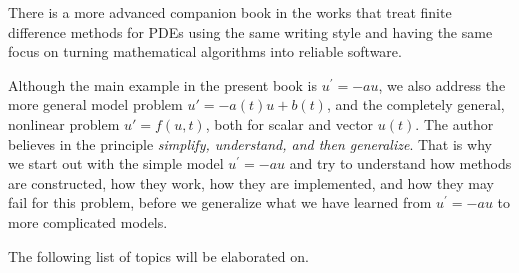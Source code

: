 \documentclass[graybox,sectrefs,envcountresetchap,open=right,final]{svmonodo}
\begin{document}
There is a more advanced companion book in the works that treat finite
difference methods for PDEs using the same writing style and having
the same focus on turning mathematical algorithms into reliable
software.

Although the main example in the present book is $u^{\prime}=-au$, we
also address the more general model problem $u'=-a(t)u + b(t)$, and
the completely general, nonlinear problem $u'=f(u,t)$, both for scalar
and vector $u(t)$. The author believes in the principle \emph{simplify,
understand, and then generalize}. That is why we start out with the
simple model $u^{\prime}=-au$ and try to understand how methods are
constructed, how they work, how they are implemented, and how they may
fail for this problem, before we generalize what we have learned from
$u^{\prime}=-au$ to more complicated models.

The following list of topics will be elaborated on.
\end{document}
